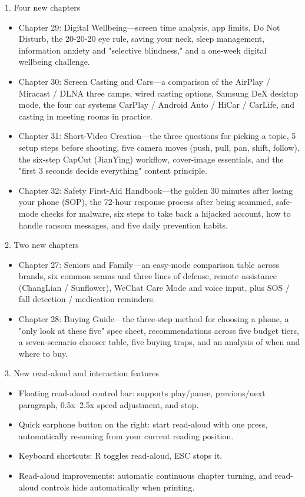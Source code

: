 
1. Four new chapters

\begin{itemize}
  \item Chapter 29: Digital Wellbeing—screen time analysis, app limits, Do Not Disturb, the 20-20-20 eye rule, saving your neck, sleep management, information anxiety and "selective blindness," and a one-week digital wellbeing challenge.
  \item Chapter 30: Screen Casting and Cars—a comparison of the AirPlay / Miracast / DLNA three camps, wired casting options, Samsung DeX desktop mode, the four car systems CarPlay / Android Auto / HiCar / CarLife, and casting in meeting rooms in practice.
  \item Chapter 31: Short-Video Creation—the three questions for picking a topic, 5 setup steps before shooting, five camera moves (push, pull, pan, shift, follow), the six-step CapCut (JianYing) workflow, cover-image essentials, and the "first 3 seconds decide everything" content principle.
  \item Chapter 32: Safety First-Aid Handbook—the golden 30 minutes after losing your phone (SOP), the 72-hour response process after being scammed, safe-mode checks for malware, six steps to take back a hijacked account, how to handle ransom messages, and five daily prevention habits.
\end{itemize}

2. Two new chapters

\begin{itemize}
  \item Chapter 27: Seniors and Family—an easy-mode comparison table across brands, six common scams and three lines of defense, remote assistance (ChangLian / Sunflower), WeChat Care Mode and voice input, plus SOS / fall detection / medication reminders.
  \item Chapter 28: Buying Guide—the three-step method for choosing a phone, a "only look at these five" spec sheet, recommendations across five budget tiers, a seven-scenario chooser table, five buying traps, and an analysis of when and where to buy.
\end{itemize}

3. New read-aloud and interaction features

\begin{itemize}
  \item Floating read-aloud control bar: supports play/pause, previous/next paragraph, 0.5x–2.5x speed adjustment, and stop.
  \item Quick earphone button on the right: start read-aloud with one press, automatically resuming from your current reading position.
  \item Keyboard shortcuts: R toggles read-aloud, ESC stops it.
  \item Read-aloud improvements: automatic continuous chapter turning, and read-aloud controls hide automatically when printing.
\end{itemize}

